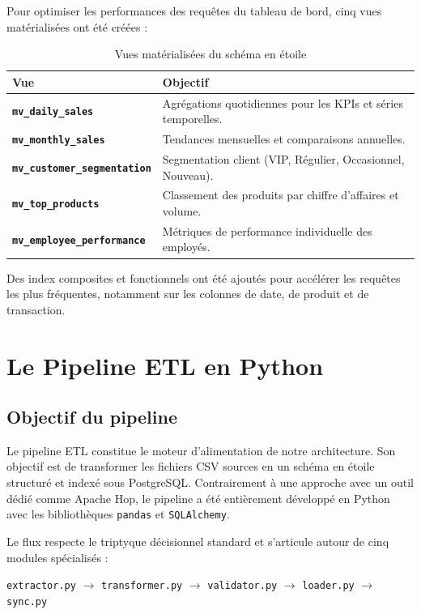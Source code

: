 \documentclass[12pt,a4paper,twoside]{report}
\begin{document}
Pour optimiser les performances des requêtes du tableau de bord, cinq vues matérialisées ont été créées :

\begin{table}[H]
\centering
{}
\begin{tabularx}{\textwidth}{>{\bfseries}p{3.5cm}X}
\toprule
\rowcolor{TableHeader}
\color{white}Vue & \color{white}Objectif \\
\midrule
\texttt{mv\_daily\_sales} & Agrégations quotidiennes pour les KPIs et séries temporelles. \\
\texttt{mv\_monthly\_sales} & Tendances mensuelles et comparaisons annuelles. \\
\texttt{mv\_customer\_segmentation} & Segmentation client (VIP, Régulier, Occasionnel, Nouveau). \\
\texttt{mv\_top\_products} & Classement des produits par chiffre d'affaires et volume. \\
\texttt{mv\_employee\_performance} & Métriques de performance individuelle des employés. \\
\bottomrule
\end{tabularx}
\caption{Vues matérialisées du schéma en étoile}
\label{tab:materialized-views}
\end{table}

Des index composites et fonctionnels ont été ajoutés pour accélérer les requêtes les plus fréquentes, notamment sur les colonnes de date, de produit et de transaction.

\section{Le Pipeline ETL en Python}

\subsection{Objectif du pipeline}

Le pipeline ETL constitue le moteur d'alimentation de notre architecture. Son objectif est de transformer les fichiers CSV sources en un schéma en étoile structuré et indexé sous PostgreSQL. Contrairement à une approche avec un outil dédié comme Apache Hop, le pipeline a été entièrement développé en Python avec les bibliothèques \texttt{pandas} et \texttt{SQLAlchemy}.

Le flux respecte le triptyque décisionnel standard et s'articule autour de cinq modules spécialisés :

\begin{center}
\texttt{extractor.py} $\rightarrow$ \texttt{transformer.py} $\rightarrow$ \texttt{validator.py} $\rightarrow$ \texttt{loader.py} $\rightarrow$ \texttt{sync.py}
\end{center}
\end{document}
